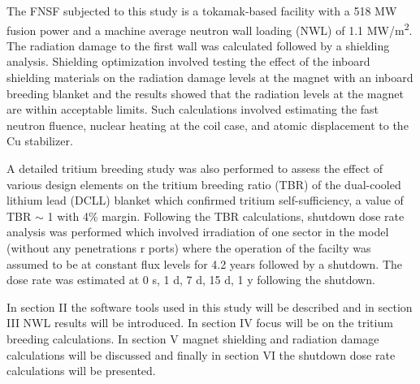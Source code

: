 \documentclass[12pt, letterpaper]{elsarticle}
\begin{document}
The FNSF subjected to this study is a tokamak-based facility with a 518 MW fusion power and a machine average neutron wall loading (NWL) of 1.1 MW/m\textsuperscript{2}. The radiation damage to the first wall was calculated followed by a shielding analysis. Shielding optimization \cite{ref_2} involved testing the effect of the inboard shielding materials on the radiation damage levels at the magnet with an inboard breeding blanket and the results showed that the radiation levels at the magnet are within acceptable limits. Such calculations involved estimating the fast neutron fluence, nuclear heating at the coil case, and atomic displacement to the Cu stabilizer.

A detailed tritium breeding study was also performed to assess the effect of various design elements on the tritium breeding ratio (TBR) of the dual-cooled lithium lead (DCLL) blanket which confirmed tritium self-sufficiency, a value of TBR $\sim$ 1 with 4\% margin. Following the TBR calculations, shutdown dose rate analysis was performed which involved irradiation of one sector in the model (without any penetrations r ports) where the operation of the facilty was assumed to be at constant flux levels for 4.2 years followed by a shutdown. The dose rate was estimated at 0 s, 1 d, 7 d, 15 d, 1 y following the shutdown. 

In section II the software tools used in this study will be described and in section III NWL results will be introduced. In section IV focus will be on the tritium breeding calculations. In section V magnet shielding and radiation damage calculations will be discussed and finally in section VI the shutdown dose rate calculations will be presented.
\end{document}
